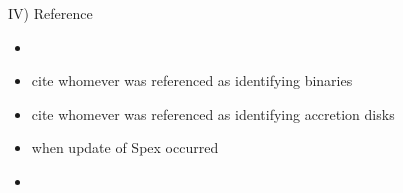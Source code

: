 IV) Reference\\
\begin{itemize}
\item \cite{Rayner_2003}\\
\item cite whomever was referenced as identifying binaries \cite{Adam_Krauss_or_other_paper}\\
\item cite whomever was referenced as identifying accretion disks \cite{disk_guy}\\
\item when update of Spex occurred \cite{Spex}\\
\item \cite{2mass_catalog_for_j_mags}
\end{itemize}  
  